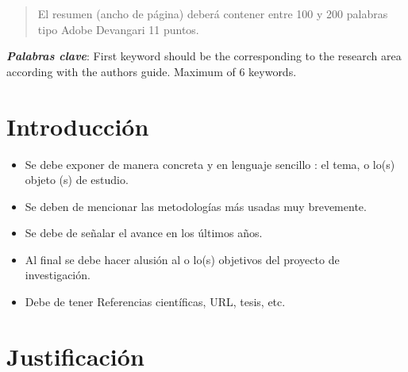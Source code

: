     
    
    \begin{abstract}
    \noindent 
    El resumen (ancho de página) deberá contener entre 100 y 200 palabras tipo Adobe Devangari 11 puntos.
    
    \end{abstract}
    \textbf{\textit{Palabras clave}}: {First keyword should be the corresponding to the research area according with the authors guide. Maximum of 6 keywords.}
    
    \section{Introducción}
    
    \begin{itemize}
        \item Se debe exponer de manera concreta y en lenguaje sencillo : el tema, o lo(s) objeto (s) de estudio. 
        \item Se deben de mencionar las metodologías más usadas muy brevemente. 
        \item Se debe de señalar el avance en los últimos años.
        \item Al final se debe hacer alusión al o lo(s) objetivos del proyecto de investigación.
        \item Debe de tener Referencias científicas, URL, tesis, etc.
    \end{itemize}
    \section{Justificación}
    
